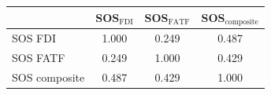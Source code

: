 \begin{tabular}{lccc}
\toprule
 & SOS$_{\text{FDI}}$ & SOS$_{\text{FATF}}$ & SOS$_{\text{composite}}$ \\
\midrule
SOS FDI & 1.000 & 0.249 & 0.487 \\
SOS FATF & 0.249 & 1.000 & 0.429 \\
SOS composite & 0.487 & 0.429 & 1.000 \\
\bottomrule
\end{tabular}
